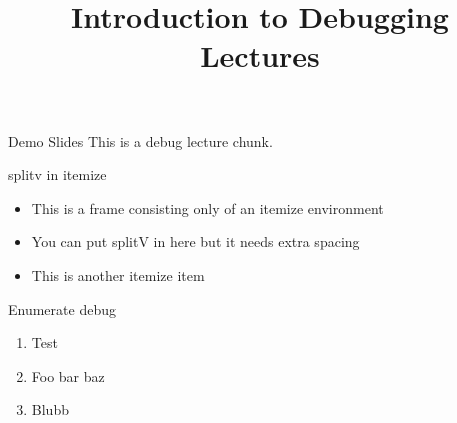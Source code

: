 \documentclass[11pt,compress,t,notes=noshow, xcolor=table]{beamer}
\title{Introduction to Debugging Lectures}
\begin{document}

\begin{frame}{Demo Slides}
  \vfill
  This is a debug lecture chunk.
  \vfill
\end{frame}


\begin{frame}{splitv in itemize}
  \begin{itemize}
  \item This is a frame consisting only of an itemize environment
  \item You can put splitV in here but it needs extra spacing
  \vfill
  \vfill
  \item This is another itemize item
  \end{itemize}
\end{frame}

\begin{frame}{Enumerate debug}
\begin{enumerate}
  \item Test
  \item Foo bar baz
  \item Blubb
\end{enumerate}
\end{frame}

\endlecture
\end{document}
